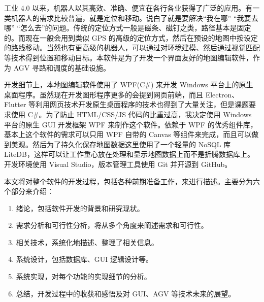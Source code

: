 
工业 4.0 以来，机器人以其高效、准确、便宜在各行各业获得了广泛的应用。有一类机器人的需求比较普遍，就是定位和移动。说白了就是要解决``我在哪'' ``我要去哪'' ``怎么去''的问题。传统的定位方式一般是磁条、磁钉之类，路径基本是固定的。而现在一般会用到类似 GPS 的高级的定位方式，然后在预设的地图中按设定的路线移动。当然也有更高级的机器人，可以通过对环境建模、然后通过视觉匹配等技术得到位置和移动目标。本软件是为了开发一个界面友好的地图编辑软件，作为 AGV 寻路和调度的基础设施。

开发细节上，本地图编辑软件使用了 WPF(C\#) 来开发 Windows 平台上的原生桌面程序。虽然现在开发图形程序更多的会提到网页前端，而且 Electron、Flutter 等利用网页技术开发原生桌面程序的技术也得到了大量关注，但是课题要求使用 C\#。为了防止 HTML/CSS/JS 代码的比重过高，我决定使用 Windows 平台的原生 GUI 开发框架 WPF 来制作这个软件。依赖于 WPF 的优秀组件库，基本上这个软件的需求可以只用 WPF 自带的 Canvas 等组件来完成，而且可以做到美观。然后为了持久化保存地图数据这里使用了一个轻量的 NoSQL 库 LiteDB，这样可以让工作重心放在处理和显示地图数据上而不是折腾数据库上。开发环境使用 Visual Studio，版本管理工具使用 Git 并开源到 GitHub\cite{url:ghrepo}。

本文将对整个软件的开发过程，包括各种前期准备工作，来进行描述。主要分为六个部分来介绍：

\begin{enumerate}
  \item 绪论，包括软件开发的背景和研究现状。
  \item 需求分析和可行性分析，将从多个角度来阐述需求和可行性。
  \item 相关技术，系统化地描述、整理了相关信息。
  \item 系统设计，包括数据库、GUI 逻辑设计等。
  \item 系统实现，对每个功能的实现细节的分析。
  \item 总结，开发过程中的收获和感悟及对 GUI、AGV 等技术未来的展望。
\end{enumerate}
